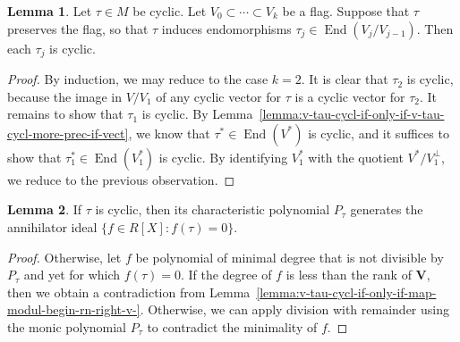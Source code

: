 \documentclass[reqno]{amsart}
\DeclareMathOperator{\End}{End}
\theoremstyle{plain} \newtheorem{theorem} {Theorem} \newtheorem{conjecture} {Conjecture} \newtheorem{corollary} [theorem] {Corollary} \newtheorem{proposition} [theorem] {Proposition} \newtheorem{fact} [theorem] {Fact}
\theoremstyle{definition} \newtheorem{definition} [theorem] {Definition}
\theoremstyle{itplain} %
\newtheorem{lemma}[theorem]{Lemma}
\begin{document}
\begin{lemma}\label{lemma:let-v_0-be-free-tau-invar-subm-v.-assume-tau-regul}
  Let $\tau \in M$ be cyclic.  Let $V_0 \subset \dotsb \subset V_k$ be a flag.  Suppose that $\tau$ preserves the flag, so that $\tau$ induces endomorphisms $\tau_j \in \End(V_j/ V_{j-1})$.  Then each $\tau_j$ is cyclic.
\end{lemma}
\begin{proof}
  By induction, we may reduce to the case $k = 2$.  It is clear that $\tau_2$ is cyclic, because the image in $V/V_1$ of any cyclic vector for $\tau$ is a cyclic vector for $\tau_2$.  It remains to show that $\tau_1$ is cyclic.  By Lemma~\ref{lemma:v-tau-cycl-if-only-if-v-tau-cycl-more-prec-if-vect}, we know that $\tau^* \in \End(V^*)$ is cyclic, and it suffices to show that $\tau_1^* \in \End(V_1^*)$ is cyclic.  By identifying $V_1^*$ with the quotient $V^* / V_1^\perp$, we reduce to the previous observation.
\end{proof}

\begin{lemma}\label{lemma:if-tau-cycl-then-char-polyn-p_tau-gener-annih-idea}
  If $\tau$ is cyclic, then its characteristic polynomial $P_\tau$ generates the annihilator ideal $\{f \in R[X] : f(\tau) = 0\}$.
\end{lemma}
\begin{proof}
  Otherwise, let $f$ be polynomial of minimal degree that is not divisible by $P_\tau$ and yet for which $f(\tau) = 0$.  If the degree of $f$ is less than the rank of $\mathbf{V}$, then we obtain a contradiction from Lemma~\ref{lemma:v-tau-cycl-if-only-if-map-modul-begin-rn-right-v-}.  Otherwise, we can apply division with remainder using the monic polynomial $P_\tau$ to contradict the minimality of $f$.
\end{proof}
\end{document}
